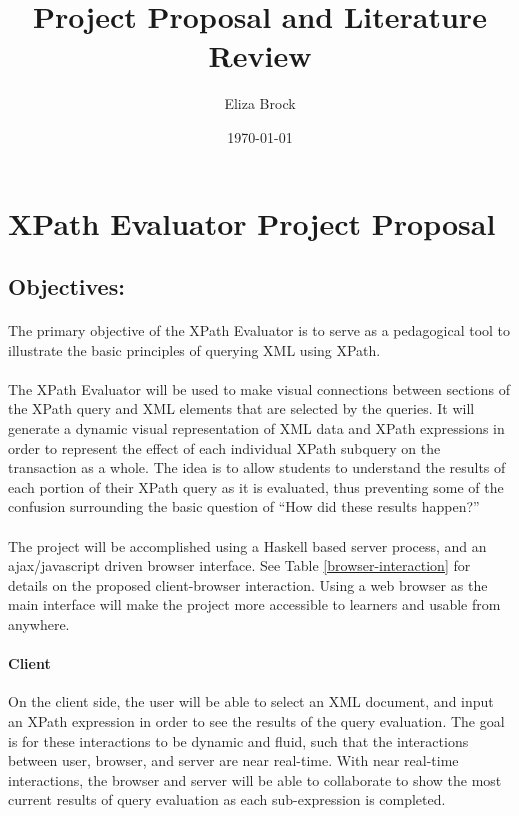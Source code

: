 \documentclass[12pt,letterpaper,final]{article}
\begin{document}
\title{Project Proposal and Literature Review}
\author{Eliza Brock}
\date{\today}
\maketitle
\tableofcontents
\newpage
\section{XPath Evaluator Project Proposal}
\subsection{Objectives:}
\paragraph{}The primary objective of the XPath Evaluator is to serve as a pedagogical tool to illustrate the basic principles of querying XML using XPath.  
\paragraph{}
The XPath Evaluator will be used to make visual connections between sections of the XPath query and XML elements that are selected by the queries.  It will generate a dynamic visual representation of XML data and XPath expressions in order to represent the effect of each individual XPath subquery on the transaction as a whole. The idea is to allow students to understand the results of each portion of their XPath query as it is evaluated, thus preventing some of the confusion surrounding the basic question of ``How did these results happen?''

\paragraph{}
The project will be accomplished using a Haskell based server process, and an ajax/javascript driven browser interface.  See Table \ref{browser-interaction} for details on the proposed client-browser interaction.  Using a web browser as the main interface will make the project more accessible to learners and usable from anywhere.

\paragraph{Client}
On the client side, the user will be able to select an XML document, and input an XPath expression in order to see the results of the query evaluation. The goal is for these interactions to be dynamic and fluid, such that the interactions between user, browser, and server are near real-time.  With near real-time interactions, the browser and server will be able to collaborate to show the most current results of query evaluation as each sub-expression is completed.
\end{document}
